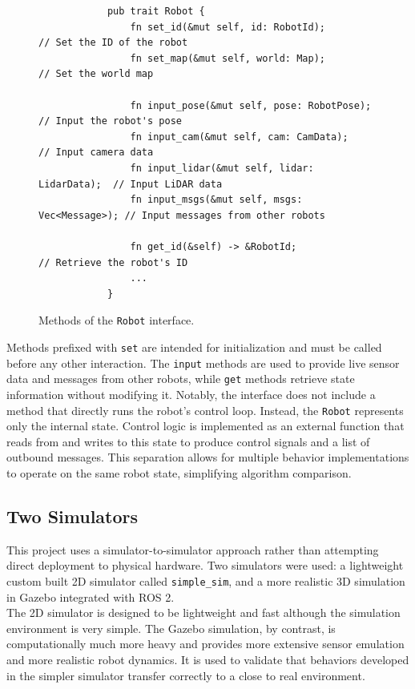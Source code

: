 \begin{figure}[H]
    \begin{center}
        \begin{verbatim}
            pub trait Robot {
                fn set_id(&mut self, id: RobotId);            // Set the ID of the robot
                fn set_map(&mut self, world: Map);            // Set the world map

                fn input_pose(&mut self, pose: RobotPose);    // Input the robot's pose
                fn input_cam(&mut self, cam: CamData);        // Input camera data
                fn input_lidar(&mut self, lidar: LidarData);  // Input LiDAR data
                fn input_msgs(&mut self, msgs: Vec<Message>); // Input messages from other robots

                fn get_id(&self) -> &RobotId;                 // Retrieve the robot's ID
                ...
            }
        \end{verbatim}
    \end{center}
    \caption{Methods of the \texttt{Robot} interface.}
    \label{fig:robot-interface}
\end{figure}

Methods prefixed with \texttt{set} are intended for initialization and must be called before any other interaction. The \texttt{input} methods are used to provide live sensor data and messages from other robots, while \texttt{get} methods retrieve state information without modifying it. Notably, the interface does not include a method that directly runs the robot’s control loop. Instead, the \texttt{Robot} represents only the internal state. Control logic is implemented as an external function that reads from and writes to this state to produce control signals and a list of outbound messages. This separation allows for multiple behavior implementations to operate on the same robot state, simplifying algorithm comparison.

\subsection{Two Simulators}
This project uses a simulator-to-simulator approach rather than attempting direct deployment to physical hardware. Two simulators were used: a lightweight custom built 2D simulator called \texttt{simple\_sim}, and a more realistic 3D simulation in Gazebo integrated with ROS 2. \\

The 2D simulator is designed to be lightweight and fast although the simulation environment is very simple. The Gazebo simulation, by contrast, is computationally much more heavy and provides more extensive sensor emulation and more realistic robot dynamics. It is used to validate that behaviors developed in the simpler simulator transfer correctly to a close to real environment. \\

